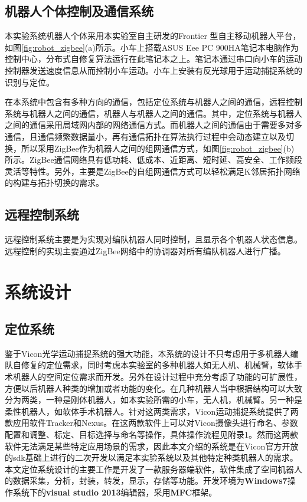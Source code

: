 \subsection{机器人个体控制及通信系统}
本实验系统机器人个体采用本实验室自主研发的Frontier \uppercase\expandafter{} 型自主移动机器人平台，如图\ref{fig:robot_zigbee}(a)所示。小车上搭载ASUS Eee PC 900HA笔记本电脑作为控制中心，分布式自修复算法运行在此笔记本之上。笔记本通过串口向小车的运动控制器发送速度信息从而控制小车运动。小车上安装有反光球用于运动捕捉系统的识别与定位。
\begin{figure*}[!htbp]
	\centering
	\hspace{1cm}
\end{figure*}

在本系统中包含有多种方向的通信，包括定位系统与机器人之间的通信，远程控制系统与机器人之间的通信，机器人与机器人之间的通信。其中，定位系统与机器人之间的通信采用局域网内部的网络通信方式。而机器人之间的通信由于需要多对多通信，且通信频繁数据量小，再有通信拓扑在算法执行过程中会动态建立以及切换，所以采用ZigBee作为机器人之间的组网通信方式，如图\ref{fig:robot_zigbee}(b)所示。ZigBee通信网络具有低功耗、低成本、近距离、短时延、高安全、工作频段灵活等特性。另外，主要是ZigBee的自组网通信方式可以轻松满足K邻居拓扑网络的构建与拓扑切换的需求。

\subsection{远程控制系统}
远程控制系统主要是为实现对编队机器人同时控制，且显示各个机器人状态信息。远程控制的实现主要通过ZigBee网络中的协调器对所有编队机器人进行广播。

\section{系统设计}

\subsection{定位系统}
鉴于Vicon光学运动捕捉系统的强大功能，本系统的设计不只考虑用于多机器人编队自修复的定位需求，同时考虑本实验室的多种机器人如无人机、机械臂，软体手术机器人的空间定位需求而开发。另外在设计过程中充分考虑了功能的可扩展性，方便以后机器人种类的增加或者功能的变化。在几种机器人当中根据结构可以大致分为两类，一种是刚体机器人，如本实验所需的小车，无人机，机械臂。另一种是柔性机器人，如软体手术机器人。针对这两类需求，Vicon运动捕捉系统提供了两款应用软件Tracker和Nexus。在这两款软件上可以对Vicon摄像头进行命名、参数配置和调整、标定、目标选择与命名等操作，具体操作流程见附录1。然而这两款软件无法满足某些特定应用场景的需求，因此本文介绍的系统是在Vicon官方开放的sdk基础上进行的二次开发以满足本实验系统以及其他特定种类机器人的需求。本文定位系统设计的主要工作是开发了一款服务器端软件，软件集成了空间机器人的数据采集，分析，封装，转发，显示，存储等功能。开发环境为\textbf{Windows7}操作系统下的\textbf{visual studio 2013}编辑器，采用\textbf{MFC}框架。

